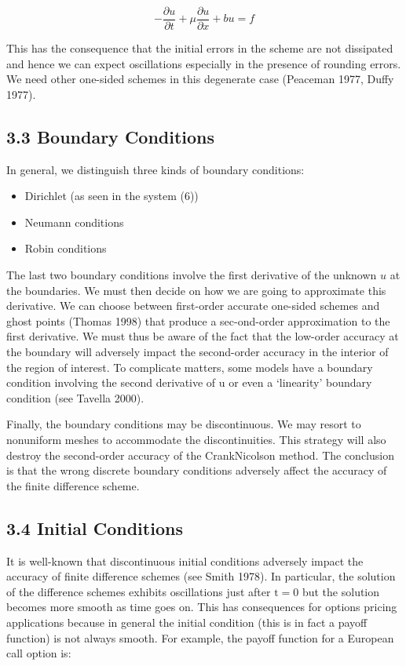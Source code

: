 \documentclass[10pt]{article}
\begin{document}
$$
-\frac{\partial u}{\partial t}+\mu \frac{\partial u}{\partial x}+b u=f
$$

This has the consequence that the initial errors in the scheme are not dissipated and hence we can expect oscillations especially in the presence of rounding errors. We need other one-sided schemes in this degenerate case (Peaceman 1977, Duffy 1977).

\subsection*{3.3 Boundary Conditions}
In general, we distinguish three kinds of boundary conditions:

\begin{itemize}
  \item Dirichlet (as seen in the system (6))
  \item Neumann conditions
  \item Robin conditions
\end{itemize}

The last two boundary conditions involve the first derivative of the unknown $u$ at the boundaries. We must then decide on how we are going to approximate this derivative. We can choose between first-order accurate one-sided schemes and ghost points (Thomas 1998) that produce a sec-ond-order approximation to the first derivative. We must thus be aware of the fact that the low-order accuracy at the boundary will adversely impact the second-order accuracy in the interior of the region of interest. To complicate matters, some models have a boundary condition involving the second derivative of u or even a ‘linearity’ boundary condition (see Tavella 2000).

Finally, the boundary conditions may be discontinuous. We may resort to nonuniform meshes to accommodate the discontinuities. This strategy will also destroy the second-order accuracy of the CrankNicolson method. The conclusion is that the wrong discrete boundary conditions adversely affect the accuracy of the finite difference scheme.

\subsection*{3.4 Initial Conditions}
It is well-known that discontinuous initial conditions adversely impact the accuracy of finite difference schemes (see Smith 1978). In particular, the solution of the difference schemes exhibits oscillations just after $\mathrm{t}=0$ but the solution becomes more smooth as time goes on. This has consequences for options pricing applications because in general the initial condition (this is in fact a payoff function) is not always smooth. For example, the payoff function for a European call option is:
\end{document}
